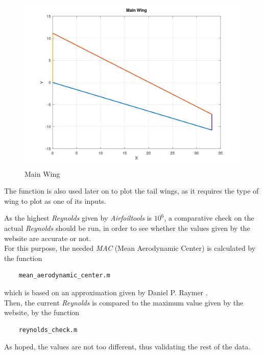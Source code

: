 \documentclass{article}
\begin{document}
\begin{figure}[h!]
    \centering
    \includegraphics[width=\textwidth]{Sources/Plots_and_Pictures/Main_Wing.png}
    \caption{Main Wing}
    \label{Main_wing}
\end{figure}

The function is also used later on to plot the tail wings, as it requires the type of wing to plot as one of its inputs.\\
\clearpage

As the highest \textit{Reynolds} given by \textit{Airfoiltools} is $10^6$, a comparative check on the 
actual \textit{Reynolds} should be run, in order to see whether the values given by the website are 
accurate or not.\\ 
For this purpose, the needed \textit{MAC} (Mean Aerodynamic Center) is calculated by the 
function \autocite{Airbus_replacement_repo}
\begin{verbatim}
    mean_aerodynamic_center.m
\end{verbatim}
which is based on an approximation given by Daniel P. Raymer \autocite{Raymer_Daniel}. \\ 

Then, the current \textit{Reynolds} is compared to the maximum value given by the website, by the function

\begin{verbatim}
    reynolds_check.m
\end{verbatim}

As hoped, the values are not too different, thus validating the rest of the data.\\ 
\clearpage
\end{document}
